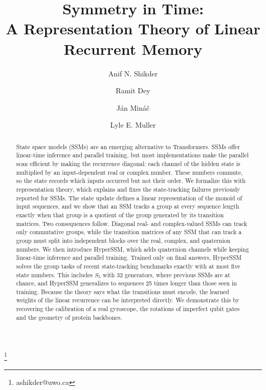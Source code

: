 \documentclass[aps,prx,reprint,superscriptaddress,longbibliography,nofootinbib,floatfix]{revtex4-2}
\theoremstyle{plain}
\theoremstyle{definition}
\begin{document}
\title{Symmetry in Time:\\ A Representation Theory of Linear Recurrent Memory}

\author{Anif N. Shikder}
\thanks{ashikder@uwo.ca}

\author{Ramit Dey}

\author{Ján Mináč}

\author{Lyle E. Muller}

\begin{abstract}
State space models (SSMs) are an emerging alternative to Transformers. SSMs offer linear-time inference and parallel training, but most implementations make the parallel scan efficient by making the recurrence diagonal: each channel of the hidden state is multiplied by an input-dependent real or complex number. These numbers commute, so the state records which inputs occurred but not their order. We formalize this with representation theory, which explains and fixes the state-tracking failures previously reported for SSMs. The state update defines a linear representation of the monoid of input sequences, and we show that an SSM tracks a group at every sequence length exactly when that group is a quotient of the group generated by its transition matrices. Two consequences follow. Diagonal real- and complex-valued SSMs can track only commutative groups, while the transition matrices of any SSM that can track a group must split into independent blocks over the real, complex, and quaternion numbers. We then introduce HyperSSM, which adds quaternion channels while keeping linear-time inference and parallel training. Trained only on final answers, HyperSSM solves the group tasks of recent state-tracking benchmarks exactly with at most five state numbers. This includes $S_5$ with 32 generators, where previous SSMs are at chance, and HyperSSM generalizes to sequences 25 times longer than those seen in training. Because the theory says what the transitions must encode, the learned weights of the linear recurrence can be interpreted directly. We demonstrate this by recovering the calibration of a real gyroscope, the rotations of imperfect qubit gates and the geometry of protein backbones.
\end{abstract}
\end{document}

